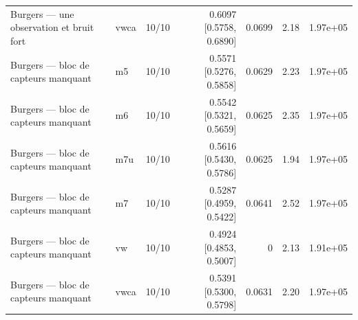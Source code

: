 \begin{tabular}{lllrrrr}
Burgers — une observation et bruit fort & vwca & 10/10 & 0.6097 [0.5758, 0.6890] & 0.0699 & 2.18 & 1.97e+05 \\
Burgers — bloc de capteurs manquant & m5 & 10/10 & 0.5571 [0.5276, 0.5858] & 0.0629 & 2.23 & 1.97e+05 \\
Burgers — bloc de capteurs manquant & m6 & 10/10 & 0.5542 [0.5321, 0.5659] & 0.0625 & 2.35 & 1.97e+05 \\
Burgers — bloc de capteurs manquant & m7u & 10/10 & 0.5616 [0.5430, 0.5786] & 0.0625 & 1.94 & 1.97e+05 \\
Burgers — bloc de capteurs manquant & m7 & 10/10 & 0.5287 [0.4959, 0.5422] & 0.0641 & 2.52 & 1.97e+05 \\
Burgers — bloc de capteurs manquant & vw & 10/10 & 0.4924 [0.4853, 0.5007] & 0 & 2.13 & 1.91e+05 \\
Burgers — bloc de capteurs manquant & vwca & 10/10 & 0.5391 [0.5300, 0.5798] & 0.0631 & 2.20 & 1.97e+05 \\
\bottomrule
\end{tabular}

